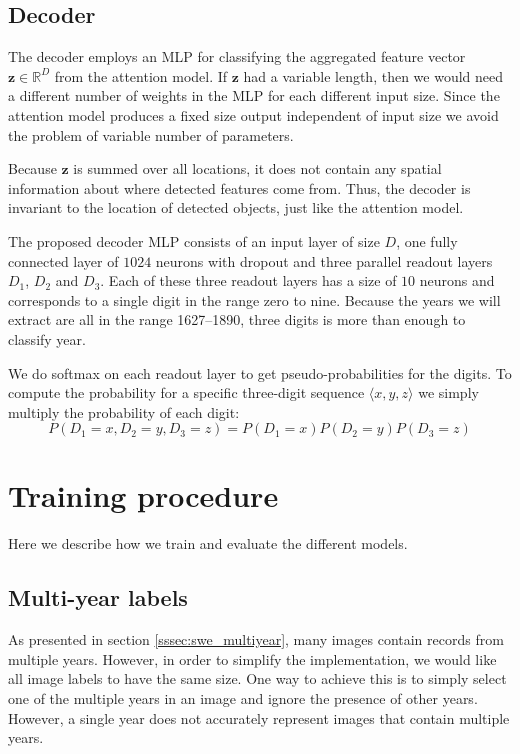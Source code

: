
\subsection{Decoder}

The decoder employs an MLP for classifying the aggregated feature vector $\mathbf{z} \in \mathbb{R}^D$ from the attention model.
If $\mathbf{z}$ had a variable length, then we would need a different number of weights in the MLP for each different input size. Since the attention model produces a fixed size output independent of input size we avoid the problem of variable number of parameters.

Because $\mathbf{z}$ is summed over all locations, it does not contain any spatial information about where detected features come from.
Thus, the decoder is invariant to the location of detected objects, just like the attention model.

The proposed decoder MLP consists of an input layer of size $D$, one fully connected layer of $1024$ neurons with dropout and three parallel readout layers $D_1$, $D_2$ and $D_3$. Each of these three readout layers has a size of $10$ neurons and corresponds to a single digit in the range zero to nine.
Because the years we will extract are all in the range 1627--1890, three digits is more than enough to classify year.

We do softmax on each readout layer to get pseudo-probabilities for the digits.
To compute the probability for a specific three-digit sequence $\langle x, y, z \rangle$ we simply multiply the probability of each digit:
\[
P(D_1=x, D_2=y, D_3=z) = P(D_1=x) P(D_2=y) P(D_3=z)
\]

\newpage
\section{Training procedure}

Here we describe how we train and evaluate the different models.

\subsection{Multi-year labels}

As presented in section \ref{sssec:swe_multiyear}, many images contain records from multiple years. However, in order to simplify the implementation, we would like all image labels to have the same size.
One way to achieve this is to simply select one of the multiple years in an image and ignore the presence of other years. However, a single year does not accurately represent images that contain multiple years.

